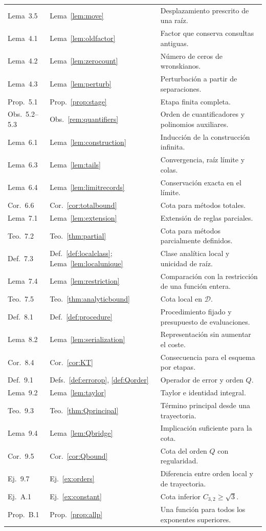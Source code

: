 \documentclass[11pt,a4paper]{article}
\numberwithin{equation}{section}
\theoremstyle{definition}
\theoremstyle{remark}
\newcommand{\DD}{\mathcal D}
\begin{document}
\begin{longtable}{@{}>{\raggedright\arraybackslash}p{}>{\raggedright\arraybackslash}p{}>{\raggedright\arraybackslash}p{}@{}}
Lema~3.5 & Lema~\ref{lem:move} & Desplazamiento prescrito de una raíz.\\
Lema~4.1 & Lema~\ref{lem:oldfactor} & Factor que conserva consultas antiguas.\\
Lema~4.2 & Lema~\ref{lem:zerocount} & Número de ceros de wronskianos.\\
Lema~4.3 & Lema~\ref{lem:perturb} & Perturbación a partir de separaciones.\\
Prop.~5.1 & Prop.~\ref{prop:stage} & Etapa finita completa.\\
Obs.~5.2--5.3 & Obs.~\ref{rem:quantifiers} & Orden de cuantificadores y polinomios auxiliares.\\
Lema~6.1 & Lema~\ref{lem:construction} & Inducción de la construcción infinita.\\
Lema~6.3 & Lema~\ref{lem:tails} & Convergencia, raíz límite y colas.\\
Lema~6.4 & Lema~\ref{lem:limitrecords} & Conservación exacta en el límite.\\
Cor.~6.6 & Cor.~\ref{cor:totalbound} & Cota para métodos totales.\\
Lema~7.1 & Lema~\ref{lem:extension} & Extensión de reglas parciales.\\
Teo.~7.2 & Teo.~\ref{thm:partial} & Cota para métodos parcialmente definidos.\\
Def.~7.3 & Def.~\ref{def:localclass}; Lema~\ref{lem:localunique} & Clase analítica local y unicidad de raíz.\\
Lema~7.4 & Lema~\ref{lem:restriction} & Comparación con la restricción de una función entera.\\
Teo.~7.5 & Teo.~\ref{thm:analyticbound} & Cota local en $\DD$.\\
Def.~8.1 & Def.~\ref{def:procedure} & Procedimiento fijado y presupuesto de evaluaciones.\\
Lema~8.2 & Lema~\ref{lem:serialization} & Representación sin aumentar el coste.\\
Cor.~8.4 & Cor.~\ref{cor:KT} & Consecuencia para el esquema por etapas.\\
Def.~9.1 & Defs.~\ref{def:errorop}, \ref{def:Qorder} & Operador de error y orden $Q$.\\
Lema~9.2 & Lema~\ref{lem:taylor} & Taylor e identidad integral.\\
Teo.~9.3 & Teo.~\ref{thm:Qprincipal} & Término principal desde una trayectoria.\\
Lema~9.4 & Lema~\ref{lem:Qbridge} & Implicación suficiente para la cota.\\
Cor.~9.5 & Cor.~\ref{cor:Qbound} & Cota del orden $Q$ con regularidad.\\
Ej.~9.7 & Ej.~\ref{ex:orders} & Diferencia entre orden local y de trayectoria.\\
Ej.~A.1 & Ej.~\ref{ex:constant} & Cota inferior $C_{3,2}\ge\sqrt3$.\\
Prop.~B.1 & Prop.~\ref{prop:allp} & Una función para todos los exponentes superiores.\\
\bottomrule
\end{longtable}
\normalsize
\end{document}
